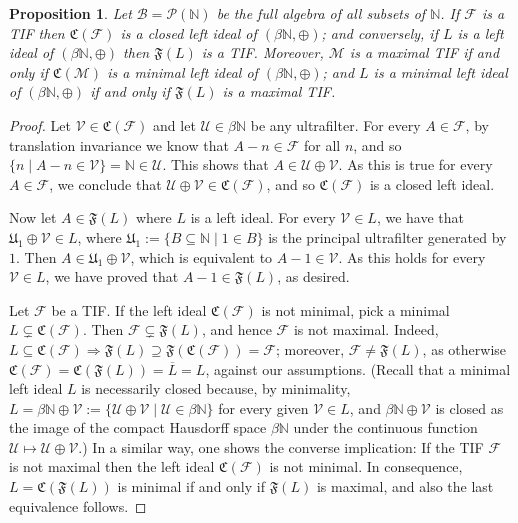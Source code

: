 \documentclass[10pt]{amsart}
\newtheorem{proposition}[theorem]{Proposition}
\theoremstyle{definition}
\theoremstyle{remark}
\def\N{\mathbb{N}}
\def\B{\mathcal{B}}
\def\F{\mathcal{F}}
\def\U{\mathcal{U}}
\def\V{\mathcal{V}}
\begin{document}
\begin{proposition}
Let $\B=\mathcal{P}(\N)$ be the full algebra of all subsets of $\N$. 
If $\F$ is a TIF then 
$\mathfrak{C}(\F)$ is a closed left ideal of $(\beta\N,\oplus)$; and conversely, 
if $L$ is a left ideal of $(\beta\N,\oplus)$ then
$\mathfrak{F}(L)$ is a TIF. 
Moreover, $\mathcal{M}$ is a maximal TIF if and only if $\mathfrak{C}(\mathcal{M})$
is a minimal left ideal of $(\beta\N,\oplus)$; and
$L$ is a minimal left ideal of $(\beta\N,\oplus)$
if and only if $\mathfrak{F}(L)$ is a maximal TIF.
\end{proposition}

\begin{proof}
Let $\V\in\mathfrak{C}(\F)$ and let $\U\in\beta\N$ be any ultrafilter.
For every $A\in\F$, by translation invariance we know that $A-n\in\F$ for all $n$,
and so $\{n\mid A-n\in \V\}=\N\in\U$.
This shows that $A\in\U\oplus\V$. As this is true for every $A\in\F$,
we conclude that $\U\oplus\V\in\mathfrak{C}(\F)$, and so $\mathfrak{C}(\F)$
is a closed left ideal.

Now let $A\in\mathfrak{F}(L)$ where $L$ is a left ideal. For every $\V\in L$,
we have that $\mathfrak{U}_1\oplus\V\in L$,
where $\mathfrak{U}_1:=\{B\subseteq\N\mid 1\in B\}$ is the principal
ultrafilter generated by $1$. Then
$A\in\mathfrak{U}_1\oplus\V$, which is equivalent to $A-1\in\V$.
As this holds for every $\V\in L$, we have proved that
$A-1\in\mathfrak{F}(L)$, as desired.

Let $\F$ be a TIF. If the left ideal $\mathfrak{C}(\F)$ is not minimal,
pick a minimal $L\subsetneq\mathfrak{C}(\F)$.
Then $\F\subsetneq \mathfrak{F}(L)$, and hence $\F$ is not maximal.
Indeed, $L\subseteq \mathfrak{C}(\F)\Rightarrow \mathfrak{F}(L)\supseteq
\mathfrak{F}(\mathfrak{C}(\F))=\F$;
moreover, $\F\ne\mathfrak{F}(L)$, as otherwise
$\mathfrak{C}(\F)=\mathfrak{C}(\mathfrak{F}(L))=\overline{L}=L$,
against our assumptions.
(Recall that a minimal left ideal
$L$ is necessarily closed because,
by minimality, $L=\beta\N\oplus\V:=\{\U\oplus\V\mid \U\in\beta\N\}$ 
for every given $\V\in L$, and $\beta\N\oplus\V$ is closed as the image 
of the compact Hausdorff space $\beta\N$ under 
the continuous function $\U\mapsto\U\oplus\V$.)
In a similar way, one shows the converse implication:
If the TIF $\F$ is not maximal then the left ideal $\mathfrak{C}(\F)$ is not minimal.
In consequence, $L=\mathfrak{C}(\mathfrak{F}(L))$ is minimal
if and only if $\mathfrak{F}(L)$ is maximal, and also
the last equivalence follows.
\end{proof}
\end{document}
